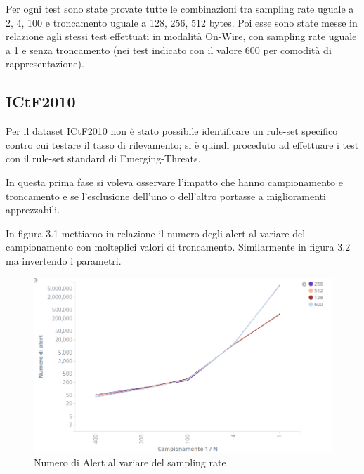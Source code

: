 \documentclass[12pt,a4paper,openright,twoside]{report}
\begin{document}
Per ogni test sono state provate tutte le combinazioni tra sampling rate uguale a
2, 4, 100 e troncamento uguale a 128, 256, 512 bytes.
Poi esse sono state messe in relazione agli stessi test effettuati in modalit\`a On-Wire,
con sampling rate uguale a 1 e senza troncamento (nei test indicato con il valore 600 per comodit\`a di rappresentazione).
\subsection{ICtF2010}

Per il dataset ICtF2010 non \`e stato possibile identificare un rule-set specifico
contro cui testare il tasso di rilevamento; si \`e quindi proceduto ad effettuare i
test con il rule-set standard di Emerging-Threats.

In questa prima fase si voleva osservare l'impatto che hanno campionamento e troncamento
e se l'esclusione dell'uno o dell'altro portasse a miglioramenti apprezzabili.

In figura 3.1 mettiamo in relazione il numero degli alert al variare del campionamento
con molteplici valori di troncamento. Similarmente in figura 3.2 ma invertendo i
parametri.


\begin{figure}[h!]
\begin{center}                          %
  \includegraphics[width=\textwidth]{images/ICTF-samp-vs-trunc.png}
  \caption{Numero di Alert al variare del sampling rate}
  \label{}
\end{center}
\end{figure}
\end{document}
